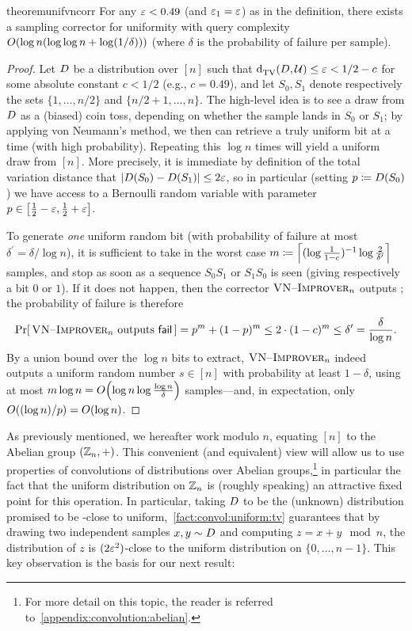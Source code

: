 \begin{restatable}{theorem}{unifvncorr}\label{lemma:sampling:corrector:uniformity:vneumann}
  For any $\varepsilon< 0.49$ (and $\varepsilon_1=\varepsilon$) as in the definition, there exists a sampling corrector for uniformity with query complexity $\bigO{\log n(\log\log n + \log(1/\delta))}$ (where $\delta$ is the probability of failure per sample).
\end{restatable}
\begin{proof}
Let $D$ be a distribution over $[n]$ such that ${\operatorname{d}_{\textrm{TV}}^{}\!\left({D, \mathcal{U}}\right)}\leq \varepsilon < 1/2 - c$ for some absolute constant {$c < 1/2$ (e.g., $c=0.49$)}, and let $S_0, S_1$ denote respectively the sets $\{1,\dots,n/2\}$ and $\{n/2+1,\dots,n\}$. The high-level idea is to see a draw from $D$ as a (biased) coin toss, depending on whether the sample lands in $S_0$ or $S_1$; by applying von Neumann's method, we then can retrieve a truly uniform bit at a time (with high probability). Repeating this $\log n$ times will yield a uniform draw from $[n]$. More precisely, it is immediate by definition of the total variation distance that $\left\lvert  D(S_0)-D(S_1)  \right\rvert \leq 2\varepsilon$, so in particular (setting $p\coloneqq D(S_0)$) we have access to a Bernoulli random variable with parameter $p\in\left[\frac{1}{2}-\varepsilon,\frac{1}{2}+\varepsilon\right]$.

To generate \emph{one} uniform random bit (with probability of failure at most $\delta^\prime=\delta/\log n$), it is sufficient to take in the worst case $m\coloneqq \left\lceil (\log\frac{1}{1-c})^{-1}\log\frac{2}{\delta^\prime} \right\rceil$ samples, and stop as soon as a sequence $S_0S_1$ or $S_1S_0$ is seen (giving respectively a bit $0$ or $1$). If it does not happen, then the corrector $\textsc{VN--Improver}_n$ outputs \fail; the probability of failure is therefore
\[
   \Pr\!\left[\, \textsc{VN--Improver}_n\text{ outputs }\textsf{fail}\, \right] = p^{m} + (1-p)^m \leq 2\cdot (1-c)^m \leq \delta^\prime = \frac{\delta}{\log n}.
\]
By a union bound over the $\log n$ bits to extract, $\textsc{VN--Improver}_n$ indeed outputs a uniform random number $s\in[n]$ with probability at least $1-\delta$, using at most $m\log n = \bigO{\log n \log\frac{\log n}{\delta}}$ samples---and, in expectation, only $\bigO{(\log n)/{p}} = \bigO{\log n}$.
\end{proof}
As previously mentioned, we hereafter work modulo $n$, equating $[n]$ to the Abelian group $(\mathbb{Z}_n,+)$. This convenient (and equivalent) view will allow us to use properties of convolutions of distributions over Abelian groups,\footnote{For more detail on this topic, the reader is referred to~\cref{appendix:convolution:abelian}.} in particular the fact that the uniform distribution on $\mathbb{Z}_n$ is (roughly speaking) an attractive fixed point for this operation. In particular, taking $D$ to be the (unknown) distribution promised to be \eps-close to uniform,~\cref{fact:convol:uniform:tv} guarantees that by drawing two independent samples $x,y\sim D$ and computing $z=x+y \mod n$, the distribution of $z$ is $(2\varepsilon^2)$-close to the uniform distribution on $\{0,\dots,n-1\}$. This key observation is the basis for our next result:
